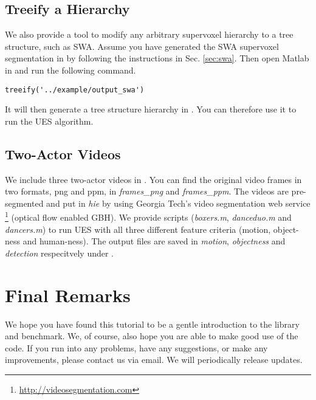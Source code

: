 \documentclass{article}
\begin{document}
\subsection{Treeify a Hierarchy}
We also provide a tool  to modify any arbitrary supervoxel hierarchy to a tree structure, such as SWA. Assume you have generated the SWA supervoxel segmentation in  by following the instructions in Sec. \ref{sec:swa}. Then open Matlab in  and run the following command.
\begin{verbatim}
treeify('../example/output_swa')
\end{verbatim}
It will then generate a tree structure hierarchy in . You can therefore use it to run the UES algorithm.

\subsection{Two-Actor Videos}
We include three two-actor videos in . You can find the original video frames in two formats, png and ppm, in \textit{frames\_png} and \textit{frames\_ppm}. The videos are pre-segmented and put in \textit{hie} by using Georgia Tech's video segmentation web service \footnote{\url{http://videosegmentation.com}} (optical flow enabled GBH). We provide scripts (\textit{boxers.m}, \textit{danceduo.m} and \textit{dancers.m}) to run UES with all three different feature criteria (motion, object-ness and human-ness). The output files are saved in \textit{motion}, \textit{objectness} and \textit{detection} respecitvely under .

\section{Final Remarks}

We hope you have found this tutorial to be a gentle introduction to the library and benchmark. We, of course, also hope you are able to make good use of the code. If you run into any problems, have any suggestions, or make any improvements, please contact us via email. We will periodically release updates.

\end{document}
